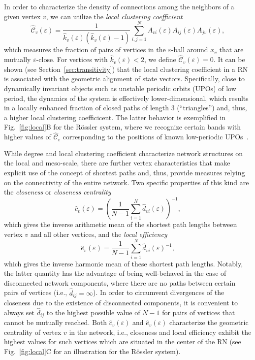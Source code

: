 In order to characterize the density of connections among the neighbors of a given vertex $v$, we can utilize the \textit{local clustering coefficient}
\begin{equation}
\hat{\mathcal{C}}_v(\varepsilon)=\frac{1}{\hat{k}_v(\varepsilon)(\hat{k}_v(\varepsilon)-1)} \sum_{i,j=1}^N A_{vi}(\varepsilon) A_{ij}(\varepsilon) A_{jv}(\varepsilon),
\label{eq:locclustering}
\end{equation}
\noindent
which measures the fraction of pairs of vertices in the $\varepsilon$-ball around $x_v$ that are
mutually $\varepsilon$-close. For vertices with $\hat{k}_v(\varepsilon)<2$, we define $\hat{\mathcal{C}}_v(\varepsilon)=0$. It can be shown (see Section~\ref{sec:transitivity}) that the local clustering coefficient in a RN is associated with the geometric alignment of state vectors. Specifically, close to dynamically invariant objects such as unstable periodic orbits (UPOs) of low period, the dynamics of the system is effectively lower-dimensional, which results in a locally enhanced fraction of closed paths of length 3 (``triangles'') and, thus, a higher local clustering coefficicent. The latter behavior is exemplified in Fig.~\ref{fig:local}B for the R\"ossler system, where we recognize certain bands with higher values of $\hat{\mathcal{C}}_v$ corresponding to the positions of known low-periodic UPOs~\cite{Donner2010NJP}.

While degree and local clustering coefficient characterize network structures on the local and meso-scale, there are further vertex characteristics that make explicit use of the concept of shortest paths and, thus, provide measures relying on the connectivity of the entire network. Two specific properties of this kind are the \textit{closeness} or \textit{closeness centrality}
\begin{equation}
\hat{c}_v(\varepsilon)=\left(\frac{1}{N-1}\sum_{i=1}^N \hat{d}_{vi}(\varepsilon) \right)^{-1},
\label{eq:closeness}
\end{equation}
\noindent
which gives the inverse arithmetic mean of the shortest path lengths between vertex $v$ and all other vertices, and the \textit{local efficiency}
\begin{equation}
\hat{e}_v(\varepsilon)=\frac{1}{N-1}\sum_{i=1}^N \hat{d}_{vi}(\varepsilon)^{-1},
\label{eq:locefficiency}
\end{equation}
\noindent
which gives the inverse harmonic mean of these shortest path lengths. Notably, the latter quantity has the advantage of being well-behaved in the case of disconnected network components, where there are no paths between certain pairs of vertices (i.e., $\hat{d}_{ij}=\infty$). In order to circumvent divergences of the closeness due to the existence of disconnected components, it is convenient to always set $\hat{d}_{ij}$ to the highest possible value of $N-1$ for pairs of vertices that cannot be mutually reached. Both $\hat{c}_v(\varepsilon)$ and $\hat{e}_v(\varepsilon)$ characterize the geometric centrality of vertex $v$ in the network, i.e., closeness and local efficiency exhibit the highest values for such vertices which are situated in the center of the RN (see Fig.~\ref{fig:local}C for an illustration for the R\"ossler system).

